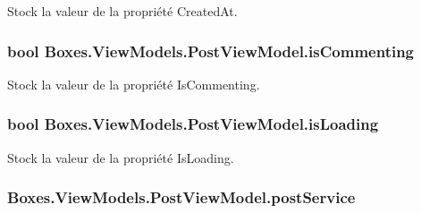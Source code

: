 Stock la valeur de la propriété {\ttfamily Created\+At}. 

\subsubsection[{\texorpdfstring{is\+Commenting}{isCommenting}}]{\setlength{\rightskip}{0pt plus 5cm}bool Boxes.\+View\+Models.\+Post\+View\+Model.\+is\+Commenting\hspace{0.3cm}{\ttfamily [private]}}\hypertarget{class_boxes_1_1_view_models_1_1_post_view_model_a06f6200613d692348207b39b079e62d8}{}\label{class_boxes_1_1_view_models_1_1_post_view_model_a06f6200613d692348207b39b079e62d8}


Stock la valeur de la propriété {\ttfamily Is\+Commenting}. 

\subsubsection[{\texorpdfstring{is\+Loading}{isLoading}}]{\setlength{\rightskip}{0pt plus 5cm}bool Boxes.\+View\+Models.\+Post\+View\+Model.\+is\+Loading\hspace{0.3cm}{\ttfamily [private]}}\hypertarget{class_boxes_1_1_view_models_1_1_post_view_model_a13b8a9424a41561b7fa8eca8fc73a0ad}{}\label{class_boxes_1_1_view_models_1_1_post_view_model_a13b8a9424a41561b7fa8eca8fc73a0ad}


Stock la valeur de la propriété {\ttfamily Is\+Loading}. 

\subsubsection[{\texorpdfstring{post\+Service}{postService}}]{ Boxes.\+View\+Models.\+Post\+View\+Model.\+post\+Service\hspace{0.3cm}{\ttfamily [private]}}\hypertarget{class_boxes_1_1_view_models_1_1_post_view_model_a429fe7a882ebbfe77a34a61455d57bae}{}\label{class_boxes_1_1_view_models_1_1_post_view_model_a429fe7a882ebbfe77a34a61455d57bae}


